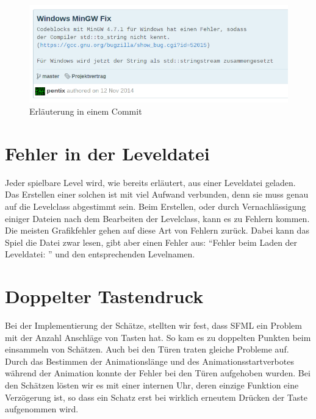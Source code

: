 \documentclass[11pt,a4paper]{scrbook}
\newcommand{\q}[1]{``#1''}
\begin{document}
\begin{figure}[h]
\centering
\includegraphics[scale=0.8]{img/e419eef.png}
\caption{Erläuterung in einem Commit}
\end{figure}

\section{Fehler in der Leveldatei}
Jeder spielbare Level wird, wie bereits erläutert, aus einer Leveldatei geladen.
Das Erstellen einer solchen ist mit viel Aufwand verbunden, denn sie muss genau auf die Levelclass abgestimmt sein.
Beim Erstellen, oder durch Vernachlässigung einiger Dateien nach dem Bearbeiten der Levelclass, kann es zu Fehlern kommen.
Die meisten Grafikfehler gehen auf diese Art von Fehlern zurück.
Dabei kann das Spiel die Datei zwar lesen, gibt aber einen Fehler aus: \q{Fehler beim Laden der Leveldatei: } und den entsprechenden Levelnamen.


\section{Doppelter Tastendruck}
Bei der Implementierung der Schätze, stellten wir fest, dass SFML ein Problem mit der Anzahl Anschläge von Tasten hat.
So kam es zu doppelten Punkten beim einsammeln von Schätzen.
Auch bei den Türen traten gleiche Probleme auf. Durch das Bestimmen der Animationslänge und des Animationsstartverbotes während der Animation konnte der Fehler bei den Türen aufgehoben wurden.
Bei den Schätzen lösten wir es mit einer internen Uhr, deren einzige Funktion eine Verzögerung ist, so dass ein Schatz erst bei wirklich erneutem Drücken der Taste aufgenommen wird.
\end{document}
